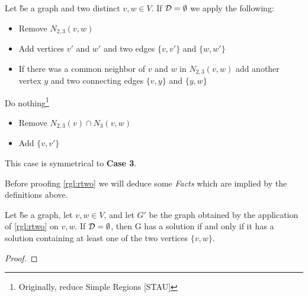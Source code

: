 \begin{rgl}\label{rgl:rtwo}
    Let \G be a graph and two distinct $v,w \in V$. If $\mathcal{D} = \emptyset$ we apply the following:
    \begin{caseof}
        
        \vspace{-5mm}
        \begin{itemize}
            \item Remove $N_{2,3}(v,w)$
            \item Add vertices $v'$ and $w'$ and two edges $\{v, v'\}$ and $\{w, w'\}$
            \item If there was a common neighbor of $v$ and $w$ in $N_{2,3}(v,w)$ add another vertex $y$ and two connecting edges  $\{v, y\}$ and $\{y, w\}$
        \end{itemize}
        Do nothing\footnote{Originally, reduce Simple Regions [STAU]}
        
        
        \vspace{-5mm}
        \begin{itemize}
            \item Remove $N_{2,3}(v) \cap N_3(v,w)$
            \item Add $\{v, v'\}$
        \end{itemize}
        
         This case is symmetrical to \textbf{Case 3}. 
    \end{caseof}
\end{rgl}


Before proofing \cref{rgl:rtwo} we will deduce some \textit{Facts} which are implied by the definitions above.

\begin{fact}
    Let \G be a graph, let $v,w \in V$, and let $G'$ be the graph obtained by the application of \cref{rgl:rtwo} on $v,w$. If $\mathcal{D} = \emptyset$, then G has a solution if and only if it has a solution containing at least one of the two vertices $\{v,w \}$.
\end{fact}
\begin{proof}

\end{proof}

